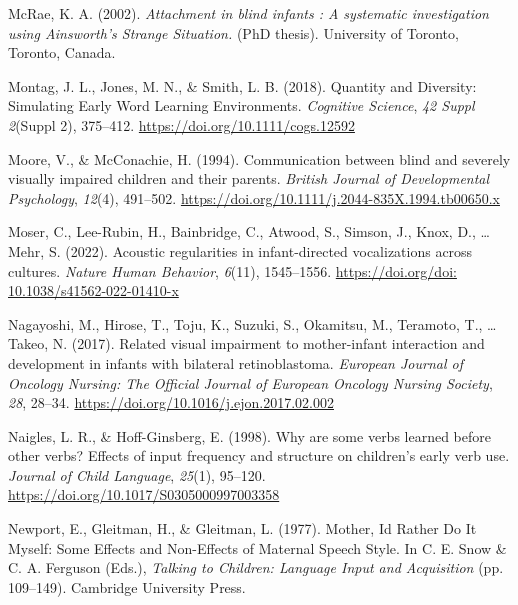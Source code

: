 \documentclass[
  man,floatsintext]{apa6}
\newlength{\cslhangindent}
\newlength{\cslentryspacingunit} %
\newenvironment{CSLReferences}[2] %
 {%
  \setlength{\parindent}{0pt}
  \ifodd #1
  \let\oldpar\par
  \def\par{\hangindent=\cslhangindent\oldpar}
  \fi
  \setlength{\parskip}{#2\cslentryspacingunit}
 }%
 {}
\begin{document}
\begin{CSLReferences}{1}{0}
\leavevmode{}%
McRae, K. A. (2002). \emph{Attachment in blind infants : A systematic investigation using {Ainsworth}'s {Strange Situation}.} (PhD thesis). University of Toronto, Toronto, Canada.

\leavevmode{}%
Montag, J. L., Jones, M. N., \& Smith, L. B. (2018). Quantity and {Diversity}: {Simulating Early Word Learning Environments}. \emph{Cognitive Science}, \emph{42 Suppl 2}(Suppl 2), 375--412. \url{https://doi.org/10.1111/cogs.12592}

\leavevmode{}%
Moore, V., \& McConachie, H. (1994). Communication between blind and severely visually impaired children and their parents. \emph{British Journal of Developmental Psychology}, \emph{12}(4), 491--502. \url{https://doi.org/10.1111/j.2044-835X.1994.tb00650.x}

\leavevmode{}%
Moser, C., Lee-Rubin, H., Bainbridge, C., Atwood, S., Simson, J., Knox, D., \ldots{} Mehr, S. (2022). Acoustic regularities in infant-directed vocalizations across cultures. \emph{Nature Human Behavior}, \emph{6}(11), 1545--1556. \href{https://doi.org/doi:\%2010.1038/s41562-022-01410-x}{https://doi.org/doi: 10.1038/s41562-022-01410-x}

\leavevmode{}%
Nagayoshi, M., Hirose, T., Toju, K., Suzuki, S., Okamitsu, M., Teramoto, T., \ldots{} Takeo, N. (2017). Related visual impairment to mother-infant interaction and development in infants with bilateral retinoblastoma. \emph{European Journal of Oncology Nursing: The Official Journal of European Oncology Nursing Society}, \emph{28}, 28--34. \url{https://doi.org/10.1016/j.ejon.2017.02.002}

\leavevmode{}%
Naigles, L. R., \& Hoff-Ginsberg, E. (1998). Why are some verbs learned before other verbs? {Effects} of input frequency and structure on children's early verb use. \emph{Journal of Child Language}, \emph{25}(1), 95--120. \url{https://doi.org/10.1017/S0305000997003358}

\leavevmode{}%
Newport, E., Gleitman, H., \& Gleitman, L. (1977). Mother, {Id Rather Do It Myself}: {Some Effects} and {Non-Effects} of {Maternal Speech Style}. In C. E. Snow \& C. A. Ferguson (Eds.), \emph{Talking to {Children}: {Language Input} and {Acquisition}} (pp. 109--149). Cambridge University Press.


\end{CSLReferences}
\end{document}

